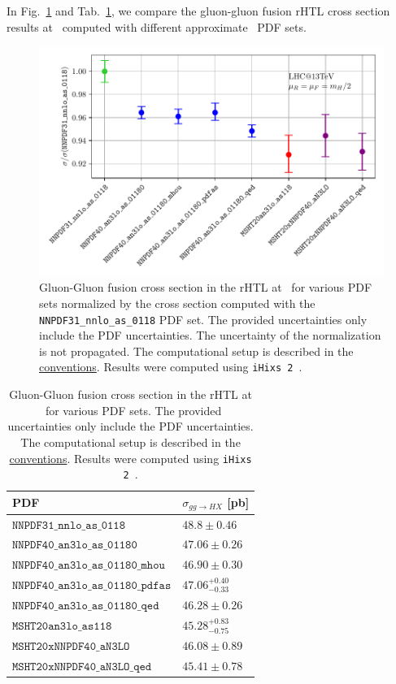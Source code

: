 In Fig.~\ref{fig:4:pdf_benchmark} and Tab.~\ref{tab:4:pdf_benchmark}, we compare the gluon-gluon fusion \acs{rHTL} cross section results at \NNNLO\ computed with different approximate \NNNLO\ \acs{PDF} sets.
\begin{figure}[h]
  \centering
  \includegraphics[width=\figurewidth]{Images/pdf_benchmark.pdf}
  \caption{Gluon-Gluon fusion cross section in the \acs{rHTL} at \NNNLO\ for various \acs{PDF} sets normalized by the cross section computed with the \texttt{NNPDF31\_nnlo\_as\_0118} \acs{PDF} set. The provided uncertainties only include the \acs{PDF} uncertainties. The uncertainty of the normalization is not propagated. The computational setup is described in the \hyperref[chap:notation_and_conventions]{conventions}. Results were computed using \texttt{iHixs 2}~\cite{Dulat:2018rbf}.}
  \label{fig:4:pdf_benchmark}
\end{figure}
\begin{table}[h]
  \centering
  \begin{tabular}{l l}
    \hline
    \acs{PDF} & $\sigma_{gg \rightarrow HX}$ [pb] \\
    \hline
    $\mathtt{NNPDF31\_nnlo\_as\_0118}$ & $48.8 \pm 0.46$ \\
    $\mathtt{NNPDF40\_an3lo\_as\_01180}$ & $47.06 \pm 0.26$ \\
    $\mathtt{NNPDF40\_an3lo\_as\_01180\_mhou}$ & $46.90 \pm 0.30$ \\
    $\mathtt{NNPDF40\_an3lo\_as\_01180\_pdfas}$ & $47.06 ^{{+0.40}}_{{-0.33}}$ \\
    $\mathtt{NNPDF40\_an3lo\_as\_01180\_qed}$ & $46.28 \pm 0.26$ \\
    $\mathtt{MSHT20an3lo\_as118}$ & $45.28 ^{{+0.83}}_{{-0.75}}$ \\
    $\mathtt{MSHT20xNNPDF40\_aN3LO}$ & $46.08 \pm 0.89$ \\
    $\mathtt{MSHT20xNNPDF40\_aN3LO\_qed}$ & $45.41 \pm 0.78$ \\
    \hline
  \end{tabular}
  \caption{Gluon-Gluon fusion cross section in the \acs{rHTL} at \NNNLO\ for various \acs{PDF} sets. The provided uncertainties only include the \acs{PDF} uncertainties. The computational setup is described in the \hyperref[chap:notation_and_conventions]{conventions}. Results were computed using \texttt{iHixs 2}~\cite{Dulat:2018rbf}.}
  \label{tab:4:pdf_benchmark}
\end{table}
